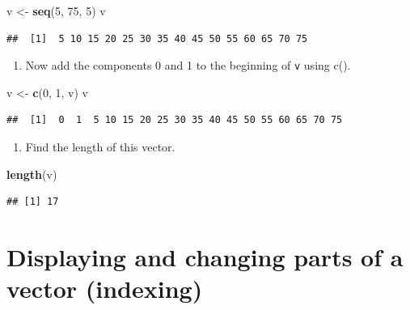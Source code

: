 \documentclass[
]{book}
\newenvironment{Shaded}{\begin{snugshade}}{\end{snugshade}}
\newcommand{\DecValTok}[1]{\textcolor[rgb]{0.00,0.00,0.81}{#1}}
\newcommand{\FunctionTok}[1]{\textcolor[rgb]{0.13,0.29,0.53}{\textbf{#1}}}
\newcommand{\NormalTok}[1]{#1}
\newcommand{\OtherTok}[1]{\textcolor[rgb]{0.56,0.35,0.01}{#1}}
\providecommand{\tightlist}{%
  \setlength{\itemsep}{0pt}\setlength{\parskip}{0pt}}
\theoremstyle{definition}
\theoremstyle{definition}
\theoremstyle{definition}
\theoremstyle{definition}
\theoremstyle{remark}
\begin{document}
\begin{Shaded}
\begin{Highlighting}[]
\NormalTok{v }\OtherTok{\textless{}{-}} \FunctionTok{seq}\NormalTok{(}\DecValTok{5}\NormalTok{, }\DecValTok{75}\NormalTok{, }\DecValTok{5}\NormalTok{)}
\NormalTok{v}
\end{Highlighting}
\end{Shaded}

\begin{verbatim}
##  [1]  5 10 15 20 25 30 35 40 45 50 55 60 65 70 75
\end{verbatim}

\begin{enumerate}
\def\labelenumi{\arabic{enumi}.}
\setcounter{enumi}{5}
\tightlist
\item
  Now add the components 0 and 1 to the beginning of \texttt{v} using c().
\end{enumerate}

\begin{Shaded}
\begin{Highlighting}[]
\NormalTok{v }\OtherTok{\textless{}{-}} \FunctionTok{c}\NormalTok{(}\DecValTok{0}\NormalTok{, }\DecValTok{1}\NormalTok{, v)}
\NormalTok{v}
\end{Highlighting}
\end{Shaded}

\begin{verbatim}
##  [1]  0  1  5 10 15 20 25 30 35 40 45 50 55 60 65 70 75
\end{verbatim}

\begin{enumerate}
\def\labelenumi{\arabic{enumi}.}
\setcounter{enumi}{6}
\tightlist
\item
  Find the length of this vector.
\end{enumerate}

\begin{Shaded}
\begin{Highlighting}[]
\FunctionTok{length}\NormalTok{(v)}
\end{Highlighting}
\end{Shaded}

\begin{verbatim}
## [1] 17
\end{verbatim}

\section{Displaying and changing parts of a vector (indexing)}\label{displaying-and-changing-parts-of-a-vector-indexing}
\end{document}
